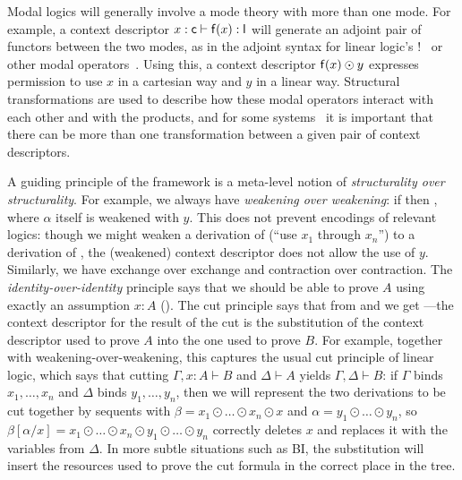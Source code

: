 Modal logics will generally involve a mode theory with more than one
mode.  For example, a context descriptor $x : \mathsf{c} \vdash \mathsf{f}(x)
: \mathsf{l}$ will generate an adjoint pair of functors between the two
modes, as in the adjoint syntax for linear logic's
$!$~\citep{bentonwadler96adjoint} or other modal
operators~\citep{reed09adjoint}.  Using this, a context descriptor
$\mathsf{f}(x) \odot y$ expresses permission to use $x$ in a cartesian way
and $y$ in a linear way.  Structural transformations are used to
describe how these modal operators interact with each other and with the
products, and for some systems~\citep{ls16adjoint} it is important that
there can be more than one transformation between a given pair of
context descriptors.

A guiding principle of the framework is a meta-level notion of
\emph{structurality over structurality}.  For example, we always have
\emph{weakening over weakening}: if  then
, where $\alpha$ itself is weakened with $y$.
This does not prevent encodings of relevant logics: though we might
weaken a derivation of 
(``use $x_1$ through $x_n$'') to a derivation of , the (weakened) context descriptor
does not allow the use of $y$.  Similarly, we have exchange over
exchange and contraction over contraction.  The \emph{identity-over-identity}
principle says that we should be able to prove $A$ using exactly an
assumption $x:A$ ({}).  The cut principle says
that from  and  we get
{}---the context descriptor for
the result of the cut is the substitution of the context descriptor used
to prove $A$ into the one used to prove $B$.  For example, together with
weakening-over-weakening, this captures the usual cut principle of
linear logic, which says that cutting $\Gamma,x:A \vdash B$ and $\Delta
\vdash A$ yields $\Gamma,\Delta \vdash B$: if $\Gamma$ binds
$x_1,\ldots,x_n$ and $\Delta$ binds $y_1,\ldots,y_n$, then we will
represent the two derivations to be cut together by sequents with $\beta
= x_1 \odot \ldots \odot x_n \odot x$ and $\alpha = y_1 \odot \ldots
\odot y_n$, so $\beta[\alpha/x] = x_1 \odot \ldots \odot x_n \odot y_1
\odot \ldots \odot y_n$ correctly deletes $x$ and replaces it with the
variables from $\Delta$.  In more subtle situations such as BI, the
substitution will insert the resources used to prove the cut formula in
the correct place in the tree.

